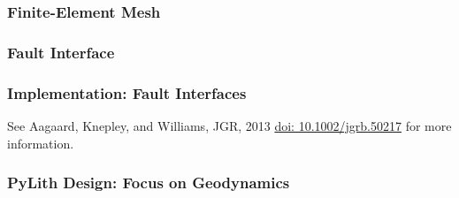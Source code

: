 \documentclass[aspectratio=169]{beamer}
\begin{document}
\begin{frame}
  \frametitle{Finite-Element Mesh}
  \summary{}

  \begin{minipage}{0.40\textwidth}
  \end{minipage}
  \hfill
  \begin{minipage}{0.58\textwidth}
  \end{minipage}
  
\end{frame}

\begin{frame}[fragile]
  \frametitle{Fault Interface}


\end{frame}


\begin{frame}
  \frametitle{Implementation: Fault Interfaces}
 
   \vfill
   See Aagaard, Knepley, and Williams, JGR, 2013
   \href{http://dx.doi.org/10.1002/jgrb.50217}{doi:
     10.1002/jgrb.50217} for more information.
 \end{frame}


\begin{frame}
  \frametitle{PyLith Design: Focus on Geodynamics}


\end{frame}
\end{document}
